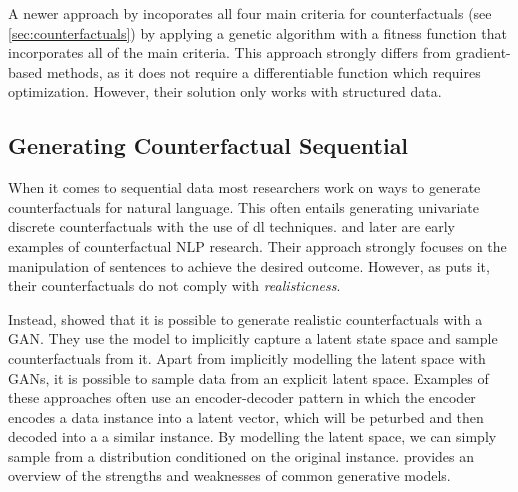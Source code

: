 \documentclass[12pt,a4paper]{report}
\begin{document}
A newer approach by \citeauthor{dandl_MultiObjectiveCounterfactualExplanations_2020} incoporates all four main criteria for counterfactuals (see \autoref{sec:counterfactuals}) by applying a genetic algorithm with a fitness function that incorporates all of the main criteria\needscite. This approach strongly differs from gradient-based methods, as it does not require a differentiable function which requires optimization.
However, their solution only works with structured data.

\subsection{Generating Counterfactual Sequential}
When it comes to sequential data most researchers work on ways to generate counterfactuals for natural language. This often entails generating univariate discrete counterfactuals with the use of \gls{dl} techniques. \citeauthor{martens_ExplainingDatadrivenDocument_2014} and later \citeauthor{krause_InteractingPredictionsVisual_2016} are early examples of counterfactual NLP research. Their approach strongly focuses on the manipulation of sentences to achieve the desired outcome. However, as \citeauthor{robeer_GeneratingRealisticNatural_2021} puts it, their counterfactuals do not comply with \emph{realisticness}.

Instead, \citeauthor{robeer_GeneratingRealisticNatural_2021} showed that it is possible to generate realistic counterfactuals with a \gls{GAN}. They use the model to implicitly capture a latent state space and sample counterfactuals from it. Apart from implicitly modelling the latent space with \glspl{GAN}, it is possible to sample data from an explicit latent space. Examples of these approaches often use an encoder-decoder pattern in which the encoder encodes a data instance into a latent vector, which will be peturbed and then decoded into a a similar instance\autocite{melnyk_ImprovedNeuralText_2017}\autocite{wang_ControllableUnsupervisedText_2019}. By modelling the latent space, we can simply sample from a distribution conditioned on the original instance. \citeauthor{bond-taylor_DeepGenerativeModelling_2021} provides an overview of the strengths and weaknesses of common generative models.
\end{document}
